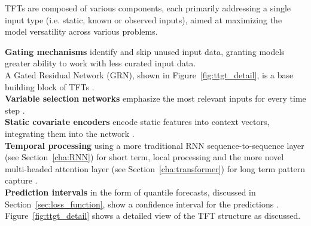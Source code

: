     
    \noindent TFTs are composed of various components, each primarily addressing a single input type (i.e. static, known or observed inputs), aimed at maximizing the model versatility across various problems.
    

    
    \noindent\textbf{Gating mechanisms} identify and skip unused input data, granting models greater ability to work with less curated input data.\\
    A Gated Residual Network (GRN), shown in Figure~\ref{fig:ttgt_detail}, is a base building block of TFTs \cite{lim_temporal_2020}.\\
    \textbf{Variable selection networks} emphasize the most relevant inputs for every time step \cite{lim_temporal_2020}.\\
    \textbf{Static covariate encoders} encode static features into context vectors, integrating them into the network \cite{lim_temporal_2020}.  \\
    \textbf{Temporal processing} using a more traditional RNN sequence-to-sequence layer (see Section~\ref{cha:RNN}) for short term, local processing and the more novel multi-headed attention layer (see Section~\ref{cha:transformer}) for long term pattern capture \cite{lim_temporal_2020}.\\
    \textbf{Prediction intervals} in the form of quantile forecasts, discussed in Section~\ref{sec:loss_function}, show a confidence interval for the predictions \cite{lim_temporal_2020}. \\
    Figure~\ref{fig:ttgt_detail} shows a detailed view of the TFT structure as discussed. 
    
